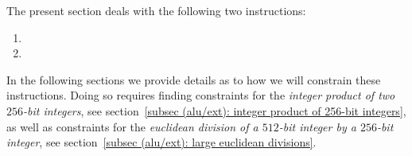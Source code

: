 The present section deals with the following two instructions:
\begin{multicols}{2}
\begin{enumerate}
	\item {}
	\item {}
\end{enumerate}
\end{multicols}
\noindent In the following sections we provide details as to how we will constrain these instructions. Doing so requires finding 
constraints for the \emph{integer product of two $256$-bit integers},
see section~\ref{subsec (alu/ext): integer product of 256-bit integers},
as well as 
constraints for the \emph{euclidean division of a $512$-bit integer by a $256$-bit integer},
see section~\ref{subsec (alu/ext): large euclidean divisions}.
